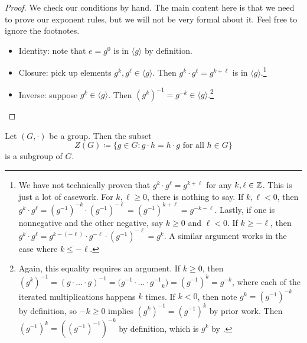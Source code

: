 \documentclass[../main.tex]{subfiles}
\begin{document}
\begin{proof}
    We check our conditions by hand. The main content here is that we need to prove our exponent rules, but we will not be very formal about it. Feel free to ignore the footnotes.
    \begin{itemize}
        \item Identity: note that $e=g^0$ is in $\langle g\rangle$ by definition.
        \item Closure: pick up elements $g^k,g^\ell\in\langle g\rangle$. Then $g^k\cdot g^\ell=g^{k+\ell}$ is in $\langle g\rangle$.\footnote{We have not technically proven that $g^k\cdot g^\ell=g^{k+\ell}$ for any $k,\ell\in\mathbb Z$. This is just a lot of casework. For $k,\ell\ge0$, there is nothing to say. If $k,\ell<0$, then $g^k\cdot g^\ell=\left(g^{-1}\right)^{-k}\cdot\left(g^{-1}\right)^{-\ell}=\left(g^{-1}\right)^{k+\ell}=g^{-k-\ell}$. Lastly, if one is nonnegative and the other negative, say $k\ge0$ and $\ell<0$. If $k\ge-\ell$, then $g^k\cdot g^\ell=g^{k-(-\ell)}\cdot g^{-\ell}\cdot\left(g^{-1}\right)^{-\ell}=g^{k}$. A similar argument works in the case where $k\le-\ell$.}
        \item Inverse: suppose $g^k\in\langle g\rangle$. Then $\left(g^k\right)^{-1}=g^{-k}\in\langle g\rangle$.\footnote{Again, this equality requires an argument. If $k\ge0$, then $\left(g^k\right)^{-1}=({g\cdot\ldots\cdot g})^{-1}=\big({g^{-1}\cdot\ldots\cdot g^{-1}}_k\big)=\left(g^{-1}\right)^k=g^{-k}$, where each of the iterated multiplications happens $k$ times. If $k<0$, then note $g^k=\left(g^{-1}\right)^{-k}$ by definition, so $-k\ge0$ implies $\left(g^k\right)^{-1}=\left(g^{-1}\right)^k$ by prior work. Then $\left(g^{-1}\right)^k=\left(\left(g^{-1}\right)^{-1}\right)^{-k}$ by definition, which is $g^k$ by .}
        \qedhere
    \end{itemize}
\end{proof}
\begin{proposition} \label{prop:center}
    Let $(G,\cdot)$ be a group. Then the subset
    \[Z(G)\coloneqq\{g\in G:g\cdot h=h\cdot g\text{ for all }h\in G\}\]
    is a subgroup of $G$.
\end{proposition}
\end{document}
